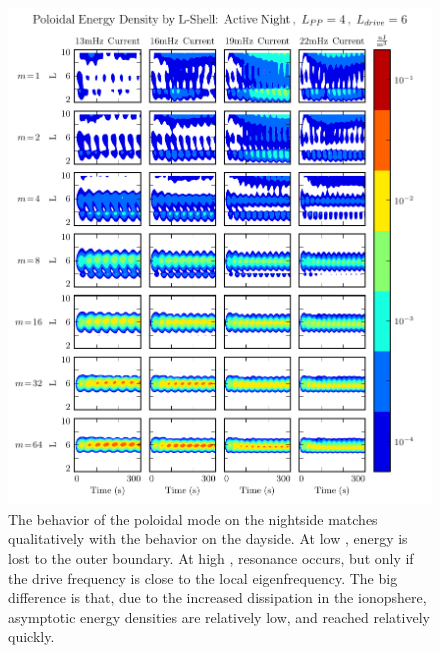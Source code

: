 \begin{figure}[!htb]
    \centering
    \includegraphics[width=\textwidth]{figures/layers_p_3_4_6.pdf}
    \caption[Radial Distribution of Poloidal Energy: Active Night, Driving at $L=6$]{
      The behavior of the poloidal mode on the nightside matches qualitatively with the behavior on the dayside. At low \azm, energy is lost to the outer boundary. At high \azm, resonance occurs, but only if the drive frequency is close to the local eigenfrequency. The big difference is that, due to the increased dissipation in the ionopshere, asymptotic energy densities are relatively low, and reached relatively quickly. 
    }
    \label{fig_layers_p_3_4_6}
\end{figure}

